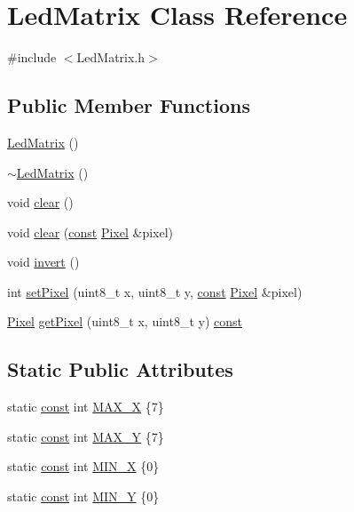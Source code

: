 \hypertarget{class_led_matrix}{}\section{Led\+Matrix Class Reference}
\label{class_led_matrix}


{\ttfamily \#include $<$Led\+Matrix.\+h$>$}

\subsection*{Public Member Functions}
\begin{DoxyCompactItemize}
\item 
\hyperlink{class_led_matrix_a2604720ce8497f9c84ad3b327629072d}{Led\+Matrix} ()
\item 
\hyperlink{class_led_matrix_a8faf8a7d51221ee711b8f0998e2a03ed}{$\sim$\+Led\+Matrix} ()
\item 
void \hyperlink{class_led_matrix_a2737d95498692cc098be8edc8937ada6}{clear} ()
\item 
void \hyperlink{class_led_matrix_ac9de9b5c9b37f13a1d9eec2d3d7970ed}{clear} (\hyperlink{functions__c_8js_afacfd9c985d225bb07483b887a801b6f}{const} \hyperlink{class_pixel}{Pixel} \&pixel)
\item 
void \hyperlink{class_led_matrix_af1e9e51216169ec51398b259129de5e1}{invert} ()
\item 
int \hyperlink{class_led_matrix_a00eb3db37486902ee8509a95c1ac09fe}{set\+Pixel} (uint8\+\_\+t x, uint8\+\_\+t y, \hyperlink{functions__c_8js_afacfd9c985d225bb07483b887a801b6f}{const} \hyperlink{class_pixel}{Pixel} \&pixel)
\item 
\hyperlink{class_pixel}{Pixel} \hyperlink{class_led_matrix_a7f46ff6f7d413db5ac77225d47219397}{get\+Pixel} (uint8\+\_\+t x, uint8\+\_\+t y) \hyperlink{functions__c_8js_afacfd9c985d225bb07483b887a801b6f}{const} 
\end{DoxyCompactItemize}
\subsection*{Static Public Attributes}
\begin{DoxyCompactItemize}
\item 
static \hyperlink{functions__c_8js_afacfd9c985d225bb07483b887a801b6f}{const} int \hyperlink{class_led_matrix_a6da341535a246a5395b0a46569618830}{M\+A\+X\+\_\+X} \{7\}
\item 
static \hyperlink{functions__c_8js_afacfd9c985d225bb07483b887a801b6f}{const} int \hyperlink{class_led_matrix_aa6cf03e172a1efe233aaac293be202bd}{M\+A\+X\+\_\+Y} \{7\}
\item 
static \hyperlink{functions__c_8js_afacfd9c985d225bb07483b887a801b6f}{const} int \hyperlink{class_led_matrix_a30e3af90d4c9a83aec44e71914f86aa3}{M\+I\+N\+\_\+X} \{0\}
\item 
static \hyperlink{functions__c_8js_afacfd9c985d225bb07483b887a801b6f}{const} int \hyperlink{class_led_matrix_a4bb052cfec297bc54387decb20a0f17f}{M\+I\+N\+\_\+Y} \{0\}
\end{DoxyCompactItemize}


